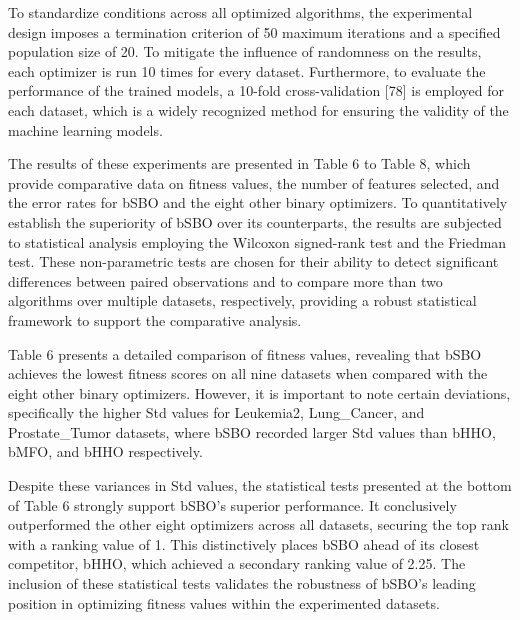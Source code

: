 \documentclass{article} %
\begin{document}
To standardize conditions across all optimized algorithms, the experimental design imposes a termination criterion of 50 maximum iterations and a specified population size of 20. To mitigate the influence of randomness on the results, each optimizer is run 10 times for every dataset. Furthermore, to evaluate the performance of the trained models, a 10-fold cross-validation [78] is employed for each dataset, which is a widely recognized method for ensuring the validity of the machine learning models.

The results of these experiments are presented in Table 6 to Table 8, which provide comparative data on fitness values, the number of features selected, and the error rates for bSBO and the eight other binary optimizers. To quantitatively establish the superiority of bSBO over its counterparts, the results are subjected to statistical analysis employing the Wilcoxon signed-rank test and the Friedman test. These non-parametric tests are chosen for their ability to detect significant differences between paired observations and to compare more than two algorithms over multiple datasets, respectively, providing a robust statistical framework to support the comparative analysis.

Table 6 presents a detailed comparison of fitness values, revealing that bSBO achieves the lowest fitness scores on all nine datasets when compared with the eight other binary optimizers. However, it is important to note certain deviations, specifically the higher Std values for Leukemia2, Lung\_Cancer, and Prostate\_Tumor datasets, where bSBO recorded larger Std values than bHHO, bMFO, and bHHO respectively.

Despite these variances in Std values, the statistical tests presented at the bottom of Table 6 strongly support bSBO's superior performance. It conclusively outperformed the other eight optimizers across all datasets, securing the top rank with a ranking value of 1. This distinctively places bSBO ahead of its closest competitor, bHHO, which achieved a secondary ranking value of 2.25. The inclusion of these statistical tests validates the robustness of bSBO's leading position in optimizing fitness values within the experimented datasets.
\end{document}
